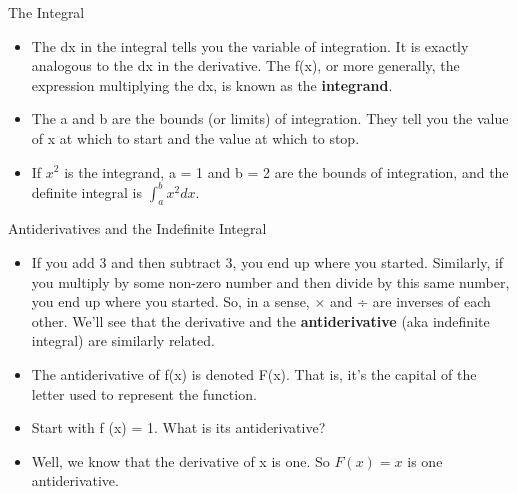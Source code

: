 \documentclass[
  ignorenonframetext,
]{beamer}
\begin{document}
\begin{frame}{The Integral}
\protect\hypertarget{the-integral-4}{}

\begin{itemize}
\item
  The dx in the integral tells you the variable of integration. It is
  exactly analogous to the dx in the derivative. The f(x), or more
  generally, the expression multiplying the dx, is known as the
  \textbf{integrand}.
\item
  The a and b are the bounds (or limits) of integration. They tell you
  the value of x at which to start and the value at which to stop.
\item
  If \(x^{2}\) is the integrand, a = 1 and b = 2 are the bounds of
  integration, and the definite integral is \(\int_{a}^{b}x^{2}dx\).
\end{itemize}

\end{frame}

\begin{frame}{Antiderivatives and the Indefinite Integral}
\protect\hypertarget{antiderivatives-and-the-indefinite-integral}{}

\begin{itemize}
\item
  If you add 3 and then subtract 3, you end up where you started.
  Similarly, if you multiply by some non-zero number and then divide by
  this same number, you end up where you started. So, in a sense, × and
  ÷ are inverses of each other. We'll see that the derivative and the
  \textbf{antiderivative} (aka indefinite integral) are similarly
  related.
\item
  The antiderivative of f(x) is denoted F(x). That is, it's the capital
  of the letter used to represent the function.
\item
  Start with f (x) = 1. What is its antiderivative?
\item
  Well, we know that the derivative of x is one. So \(F(x) = x\) is one
  antiderivative.
\end{itemize}

\end{frame}
\end{document}
